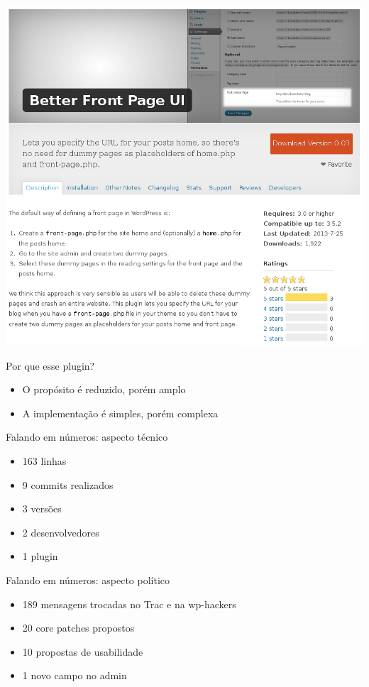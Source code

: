 \documentclass[handout]{beamer}
\begin{document}
\begin{frame}
\begin{center}
  \includegraphics[width=\textwidth]{./img/plugin-screenshot.png}
\end{center}
\end{frame}

\begin{frame}{Por que esse plugin?}
\begin{itemize}
  \pause \item O propósito é reduzido, porém amplo
  \pause \item A implementação é simples, porém complexa
\end{itemize}
\end{frame}

\begin{frame}{Falando em números: aspecto técnico}
\begin{itemize}
  \pause \item 163 linhas
  \pause \item 9 commits realizados
  \pause \item 3 versões
  \pause \item 2 desenvolvedores
  \pause \item 1 plugin
\end{itemize}
\end{frame}

\begin{frame}{Falando em números: aspecto político}
\begin{itemize}
  \pause \item 189 mensagens trocadas no Trac e na wp-hackers
  \pause \item 20 core patches propostos
  \pause \item 10 propostas de usabilidade
  \pause \item 1 novo campo no admin
\end{itemize}
\end{frame}
\end{document}
